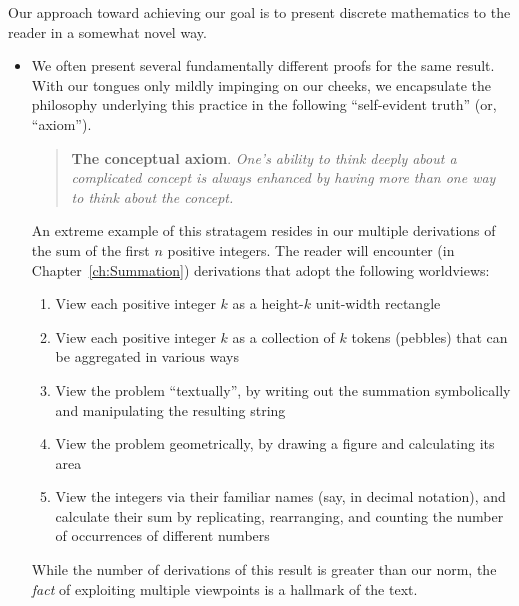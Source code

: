 Our approach toward achieving our goal is to present discrete
mathematics to the reader in a somewhat novel way.
\begin{itemize}
\item
We often present several fundamentally different proofs for the same
result.  With our tongues only mildly impinging on our cheeks, we
encapsulate the philosophy underlying this practice in the following
``self-evident truth'' (or, ``axiom'').  
\begin{quote}
{\bf The conceptual axiom}.
{\em
One's ability to think deeply about a complicated concept is always
enhanced by having more than one way to think about the concept.}
\end{quote}

An extreme example of this stratagem resides in our multiple
derivations of the sum of the first $n$ positive integers.  The reader
will encounter (in Chapter~\ref{ch:Summation}) derivations that adopt
the following worldviews:
  \begin{enumerate}
  \item
View each positive integer $k$ as a height-$k$ unit-width rectangle
  \item
View each positive integer $k$ as a collection of $k$ tokens (pebbles)
that can be aggregated in various ways
  \item
View the problem ``textually'', by writing out the summation
symbolically and manipulating the resulting string
  \item
View the problem geometrically, by drawing a figure and calculating
its area
  \item
View the integers via their familiar names (say, in decimal notation),
and calculate their sum by replicating, rearranging, and counting the
number of occurrences of different numbers
  \end{enumerate}
While the number of derivations of this result is greater than our
norm, the {\em fact} of exploiting multiple viewpoints is a hallmark
of the text.


\end{itemize}

